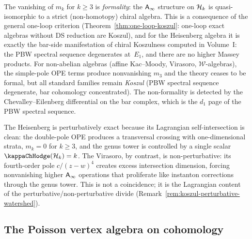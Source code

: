 \begin{remark}
\label{rem:rosetta-formality-koszulness}
The vanishing of $m_k$ for $k \geq 3$ is \emph{formality}: the
$\mathsf{A}_{\infty}$ structure on $\mathcal{H}_k$ is quasi-isomorphic to a strict
(non-homotopy) chiral algebra. This is a consequence of the
general one-loop criterion (Theorem~\ref{thm:one-loop-koszul}:
one-loop exact algebras without DS reduction are Koszul), and
for the Heisenberg algebra it is exactly the bar-side manifestation
of chiral Koszulness computed in Volume~I: the PBW spectral
sequence degenerates at~$E_1$, and there are no higher Massey
products. For non-abelian algebras (affine Kac--Moody, Virasoro,
$\mathcal{W}$-algebras), the simple-pole OPE terms produce
nonvanishing $m_3$ and the theory ceases to be formal,
but all standard families remain \emph{Koszul}
(PBW spectral sequence degenerate, bar cohomology concentrated).
The non-formality is detected by the Chevalley--Eilenberg
differential on the bar complex, which is the $d_1$ page of
the PBW spectral sequence.
\end{remark}

\begin{remark}
\label{rem:rosetta-lagrangian-perturbative}
The Heisenberg is perturbatively exact because its Lagrangian
self-intersection is clean: the double-pole OPE produces a
transversal crossing with one-dimensional strata, $m_k = 0$
for $k \ge 3$, and the genus tower is controlled by a single
scalar $\kappaChHodge(\cH_k) = k$. The Virasoro, by contrast, is
non-perturbative: its fourth-order pole $c/(z-w)^4$ creates
excess intersection dimension, forcing nonvanishing higher
$\mathsf{A}_{\infty}$ operations that proliferate like instanton corrections
through the genus tower. This is not a coincidence; it is the
Lagrangian content of the perturbative/non-perturbative divide
(Remark~\ref{rem:koszul-perturbative-watershed}).
\end{remark}

\subsection{The Poisson vertex algebra on cohomology}
\label{subsec:rosetta-pva}

